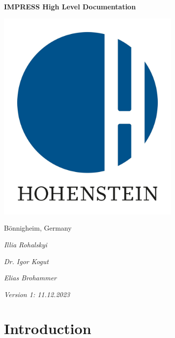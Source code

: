 \documentclass{report}
\begin{document}
\begin{titlepage}
    \centerline{\Huge\textbf{IMPRESS High Level Documentation}}
    
    \vspace*{1cm}
    
    \centerline{\includegraphics[width=9cm]{hohenstein logo.jpg}}
    
    \vspace*{1.5cm}
    
    \centerline{\LARGE Bönnigheim, Germany}
    
    \vspace*{1cm}
    
    \centerline{\Large\textit{Illia Rohalskyi}}

    \vspace*{0.2cm}
    
    \centerline{\Large\textit{Dr. Igor Kogut}}

    \vspace*{0.2cm}
    
    \centerline{\Large\textit{Elias Brohammer}}
    
    \vspace*{1cm}
    
    \centerline{\Large\textit{Version 1: 11.12.2023}}
    
\end{titlepage}


\tableofcontents
\chapter{Introduction}
\end{document}

